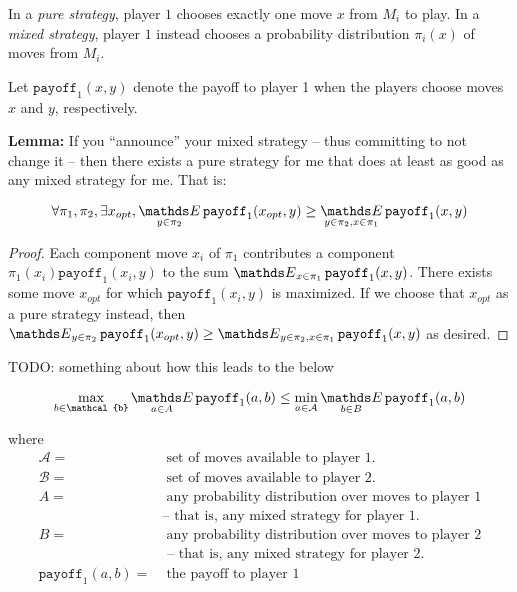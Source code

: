 In a \emph{pure strategy}, player $1$ chooses exactly one move $x$ from $M_i$ to play. In a \emph{mixed strategy}, player $1$ instead chooses a probability distribution $\pi_i(x)$ of moves from $M_i$.

Let $\texttt{payoff}_1(x, y)$ denote the payoff to player 1 when the players choose moves $x$ and $y$, respectively.

\textbf{Lemma:} If you ``announce'' your mixed strategy -- thus committing to not change it -- then there exists a pure strategy for me that does at least as good as any mixed strategy for me. That is:

$$\forall \pi_1, \pi_2, \exists x_{opt}, \Expected_{y \in \pi_2} \texttt{payoff}_1(x_{opt}, y) \geq \Expected_{y \in \pi_2, x \in \pi_1} \texttt{payoff}_1(x, y)$$

\begin{proof}

Each component move $x_i$ of $\pi_1$ contributes a component $\pi_1(x_i) \texttt{payoff}_1(x_i, y)$ to the sum $\Expected_{x \in \pi_1} \texttt{payoff}_1(x, y)$. There exists some move $x_{opt}$ for which $\texttt{payoff}_1(x_i, y)$ is maximized. If we choose that $x_{opt}$ as a pure strategy instead, then $\Expected_{y \in \pi_2} \texttt{payoff}_1(x_{opt}, y) \geq \Expected_{y \in \pi_2, x \in \pi_1} \texttt{payoff}_1(x, y)$ as desired.

\end{proof}

TODO: something about how this leads to the below

$$\max_{b \in \mathcal{b}} \Expected_{a \in A} \texttt{payoff}_1(a, b) \leq \min_{a \in \mathcal{A}} \Expected_{b \in B} \texttt{payoff}_1(a, b)$$

where \begin{align*}
\mathcal{A} =&\; \text{set of moves available to player 1.}
\\
\mathcal{B} =&\; \text{set of moves available to player 2.}
\\
A =&\; \text{any probability distribution over moves to player 1}
    \\&\text{-- that is, any mixed strategy for player 1.}
\\
B =&\; \text{any probability distribution over moves to player 2}
    \\&\text{ -- that is, any mixed strategy for player 2.}
\\
\texttt{payoff}_1(a, b) =&\; \text{the payoff to player 1}
\end{align*}

